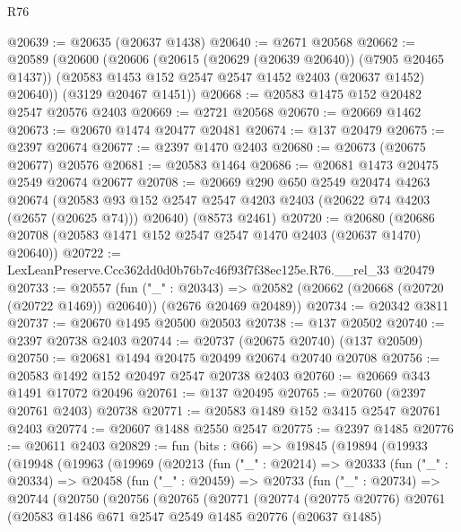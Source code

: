 \begin{lexlean}{R76}
\begin{coremodule}
@20639 := @20635 (@20637 @1438)
@20640 := @2671 @20568
@20662 := @20589
    (@20600
      (@20606
        (@20615 (@20629 (@20639 @20640)) (@7905 @20465 @1437))
        (@20583 @1453 @152 @2547 @2547 @1452 @2403 (@20637 @1452) @20640))
      (@3129 @20467 @1451))
@20668 := @20583 @1475 @152 @20482 @2547 @20576 @2403
@20669 := @2721 @20568
@20670 := @20669 @1462
@20673 := @20670 @1474 @20477 @20481
@20674 := @137 @20479
@20675 := @2397 @20674
@20677 := @2397 @1470 @2403
@20680 := @20673 (@20675 @20677) @20576
@20681 := @20583 @1464
@20686 := @20681 @1473 @20475 @2549 @20674 @20677
@20708 := @20669
    @290
    @650
    @2549
    @20474
    @4263
    @20674
    (@20583 @93 @152 @2547 @2547 @4203 @2403 (@20622 @74 @4203 (@2657 (@20625 @74))) @20640)
    (@8573 @2461)
@20720 := @20680 (@20686 @20708 (@20583 @1471 @152 @2547 @2547 @1470 @2403 (@20637 @1470) @20640))
@20722 := LexLeanPreserve.Ccc362dd0d0b76b7c46f93f7f38ec125e.R76.__rel_33 @20479
@20733 := @20557
    (fun ("_" : @20343) =>
    @20582 (@20662 (@20668 (@20720 (@20722 @1469)) @20640)) (@2676 @20469 @20489))
@20734 := @20342 @3811
@20737 := @20670 @1495 @20500 @20503
@20738 := @137 @20502
@20740 := @2397 @20738 @2403
@20744 := @20737 (@20675 @20740) (@137 @20509)
@20750 := @20681 @1494 @20475 @20499 @20674 @20740 @20708
@20756 := @20583 @1492 @152 @20497 @2547 @20738 @2403
@20760 := @20669 @343 @1491 @17072 @20496
@20761 := @137 @20495
@20765 := @20760 (@2397 @20761 @2403) @20738
@20771 := @20583 @1489 @152 @3415 @2547 @20761 @2403
@20774 := @20607 @1488 @2550 @2547
@20775 := @2397 @1485
@20776 := @20611 @2403
@20829 := fun (bits : @66) =>
  @19845
    (@19894
      (@19933
        (@19948
          (@19963
            (@19969
              (@20213
                (fun ("_" : @20214) =>
                @20333
                  (fun ("_" : @20334) =>
                  @20458
                    (fun ("_" : @20459) =>
                    @20733
                      (fun ("_" : @20734) =>
                      @20744
                        (@20750
                          (@20756
                            (@20765
                              (@20771
                                (@20774
                                  (@20775 @20776)
                                  @20761
                                  (@20583
                                    @1486
                                    @671
                                    @2547
                                    @2549
                                    @1485
                                    @20776
                                    (@20637 @1485)

\end{coremodule}
\end{lexlean}
